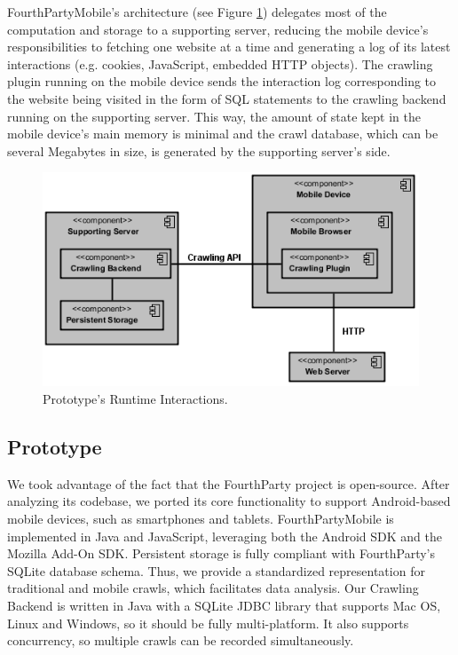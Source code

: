 \documentclass{acm_proc_article-sp}
\begin{document}
FourthPartyMobile's architecture (see Figure \ref{fig:component_diagram}) delegates most of the computation and storage to a supporting server, reducing the mobile device's responsibilities to fetching one website at a time and generating a log of its latest interactions (e.g. cookies, JavaScript, embedded HTTP objects). The crawling plugin running on the mobile device sends the interaction log corresponding to the website being visited in the form of SQL statements to the crawling backend running on the supporting server. This way, the amount of state kept in the mobile device's main memory is minimal and the crawl database, which can be several Megabytes in size, is generated by the supporting server's side. 

\begin{figure}[h] 
\centering \includegraphics[scale=0.65]{diagrams/component_diagram.png}
\caption{Prototype's Runtime Interactions.}
\label{fig:component_diagram}
\end{figure}

\subsection{Prototype}
We took advantage of the fact that the FourthParty project is open-source. After analyzing its codebase, we ported its core functionality to support Android-based mobile devices, such as smartphones and tablets. FourthPartyMobile is implemented in Java and JavaScript, leveraging both the Android SDK and the Mozilla Add-On SDK. Persistent storage is fully compliant with FourthParty's SQLite database schema. Thus, we provide a standardized representation for traditional and mobile crawls, which facilitates data analysis. Our Crawling Backend is written in Java with a SQLite JDBC library that supports Mac OS, Linux and Windows, so it should be fully multi-platform. It also supports concurrency, so multiple crawls can be recorded simultaneously. 
\end{document}
